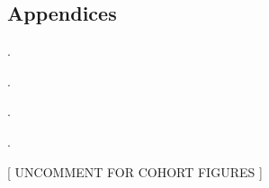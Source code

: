\renewcommand\thesection{\Alph{section}}

\begin{appendices}
    \chapter*{Appendices}\label{sec:appendix}

    

    .

    .

    .

    .

        [ UNCOMMENT FOR COHORT FIGURES ]


\end{appendices}

